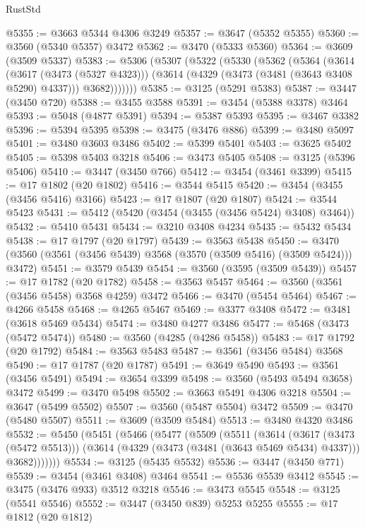 \begin{lexlean}{RustStd}
\begin{coremodule}
@5355 := @3663 @5344 @4306 @3249
@5357 := @3647 (@5352 @5355)
@5360 := @3560 (@5340 @5357) @3472
@5362 := @3470 (@5333 @5360)
@5364 := @3609 (@3509 @5337)
@5383 := @5306
    (@5307
      (@5322
        (@5330
          (@5362
            (@5364
              (@3614
                (@3617 (@3473 (@5327 @4323)))
                (@3614 (@4329 (@3473 (@3481 (@3643 @3408 @5290) @4337))) @3682)))))))
@5385 := @3125 (@5291 @5383)
@5387 := @3447 (@3450 @720)
@5388 := @3455 @3588
@5391 := @3454 (@5388 @3378) @3464
@5393 := @5048 (@4877 @5391)
@5394 := @5387 @5393
@5395 := @3467 @3382
@5396 := @5394 @5395
@5398 := @3475 (@3476 @886)
@5399 := @3480 @5097
@5401 := @3480 @3603 @3486
@5402 := @5399 @5401
@5403 := @3625 @5402
@5405 := @5398 @5403 @3218
@5406 := @3473 @5405
@5408 := @3125 (@5396 @5406)
@5410 := @3447 (@3450 @766)
@5412 := @3454 (@3461 @3399)
@5415 := @17 @1802 (@20 @1802)
@5416 := @3544 @5415
@5420 := @3454 (@3455 (@3456 @5416) @3166)
@5423 := @17 @1807 (@20 @1807)
@5424 := @3544 @5423
@5431 := @5412 (@5420 (@3454 (@3455 (@3456 @5424) @3408) @3464))
@5432 := @5410 @5431
@5434 := @3210 @3408 @4234
@5435 := @5432 @5434
@5438 := @17 @1797 (@20 @1797)
@5439 := @3563 @5438
@5450 := @3470 (@3560 (@3561 (@3456 @5439) @3568 (@3570 (@3509 @5416) (@3509 @5424))) @3472)
@5451 := @3579 @5439
@5454 := @3560 (@3595 (@3509 @5439))
@5457 := @17 @1782 (@20 @1782)
@5458 := @3563 @5457
@5464 := @3560 (@3561 (@3456 @5458) @3568 @4259) @3472
@5466 := @3470 (@5454 @5464)
@5467 := @4266 @5458
@5468 := @4265 @5467
@5469 := @3377 @3408
@5472 := @3481 (@3618 @5469 @5434)
@5474 := @3480 @4277 @3486
@5477 := @5468 (@3473 (@5472 @5474))
@5480 := @3560 (@4285 (@4286 @5458))
@5483 := @17 @1792 (@20 @1792)
@5484 := @3563 @5483
@5487 := @3561 (@3456 @5484) @3568
@5490 := @17 @1787 (@20 @1787)
@5491 := @3649 @5490
@5493 := @3561 (@3456 @5491)
@5494 := @3654 @3399
@5498 := @3560 (@5493 @5494 @3658) @3472
@5499 := @3470 @5498
@5502 := @3663 @5491 @4306 @3218
@5504 := @3647 (@5499 @5502)
@5507 := @3560 (@5487 @5504) @3472
@5509 := @3470 (@5480 @5507)
@5511 := @3609 (@3509 @5484)
@5513 := @3480 @4320 @3486
@5532 := @5450
    (@5451
      (@5466
        (@5477
          (@5509
            (@5511
              (@3614
                (@3617 (@3473 (@5472 @5513)))
                (@3614 (@4329 (@3473 (@3481 (@3643 @5469 @5434) @4337))) @3682)))))))
@5534 := @3125 (@5435 @5532)
@5536 := @3447 (@3450 @771)
@5539 := @3454 (@3461 @3408) @3464
@5541 := @5536 @5539 @3412
@5545 := @3475 (@3476 @933) @3512 @3218
@5546 := @3473 @5545
@5548 := @3125 (@5541 @5546)
@5552 := @3447 (@3450 @839) @5253 @5255
@5555 := @17 @1812 (@20 @1812)

\end{coremodule}
\end{lexlean}
